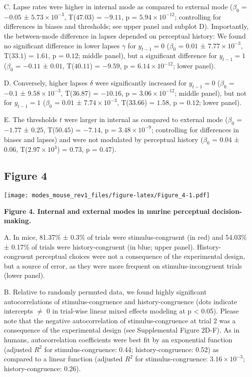 \documentclass[
]{article}
\begin{document}
C. Lapse rates were higher in internal mode as compared to external mode
(\(\beta_0\) = \(-0.05\) ± \(\ensuremath{5.73\times 10^{-3}}\),
T(\(47.03\)) = \(-9.11\), p = \(\ensuremath{5.94\times 10^{-12}}\);
controlling for differences in biases and thresholds; see upper panel
and subplot D). Importantly, the between-mode difference in lapses
depended on perceptual history: We found no significant difference in
lower lapses \(\gamma\) for \(y_{t-1} = 0\) (\(\beta_0\) = \(0.01\) ±
\(\ensuremath{7.77\times 10^{-3}}\), T(\(33.1\)) = \(1.61\), p =
\(0.12\); middle panel), but a significant difference for
\(y_{t-1} = 1\) (\(\beta_0\) = \(-0.11\) ± \(0.01\), T(\(40.11\)) =
\(-9.59\), p = \(\ensuremath{6.14\times 10^{-12}}\); lower panel).

D. Conversely, higher lapses \(\delta\) were significantly increased for
\(y_{t-1} = 0\) (\(\beta_0\) = \(-0.1\) ±
\(\ensuremath{9.58\times 10^{-3}}\), T(\(36.87\)) = \(-10.16\), p =
\(\ensuremath{3.06\times 10^{-12}}\); middle panel), but not for
\(y_{t-1} = 1\) (\(\beta_0\) = \(0.01\) ±
\(\ensuremath{7.74\times 10^{-3}}\), T(\(33.66\)) = \(1.58\), p =
\(0.12\); lower panel).

E. The thresholds \(t\) were larger in internal as compared to external
mode (\(\beta_0\) = \(-1.77\) ± \(0.25\), T(\(50.45\)) = \(-7.14\), p =
\(\ensuremath{3.48\times 10^{-9}}\); controlling for differences in
biases and lapses) and were not modulated by perceptual history
(\(\beta_0\) = \(0.04\) ± \(0.06\),
T(\(\ensuremath{2.97\times 10^{3}}\)) = \(0.73\), p = \(0.47\)).

\newpage

\hypertarget{figure-4}{%
\subsection{Figure 4}\label{figure-4}}

\texttt{[image: modes\_mouse\_rev1\_files/figure-latex/Figure\_4-1.pdf]}

\textbf{Figure 4. Internal and external modes in murine perceptual
decision-making.}

A. In mice, 81.37\% ± 0.3\% of trials were stimulus-congruent (in red)
and 54.03\% ± 0.17\% of trials were history-congruent (in blue; upper
panel). History-congruent perceptual choices were not a consequence of
the experimental design, but a source of error, as they were more
frequent on stimulus-incongruent trials (lower panel).

B. Relative to randomly permuted data, we found highly significant
autocorrelations of stimulus-congruence and history-congruence (dots
indicate intercepts \(\neq\) 0 in trial-wise linear mixed effects
modeling at p \textless{} 0.05). Please note that the negative
autocorrelation of stimulus-congruence at trial 2 was a consequence of
the experimental design (see Supplemental Figure 2D-F). As in humans,
autocorrelation coefficients were best fit by an exponential function
(adjusted \(R^2\) for stimulus-congruence: 0.44; history-congruence:
0.52) as compared to a linear function (adjusted \(R^2\) for
stimulus-congruence: \ensuremath{3.16\times 10^{-3}};
history-congruence: 0.26).
\end{document}
